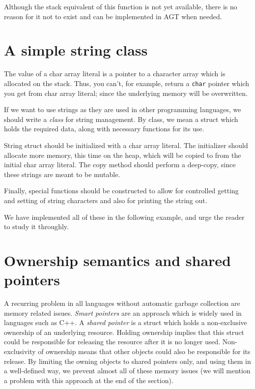 \documentclass[times, utf8, diplomski]{fer}
\theoremstyle{definition}
\newcommand{\textcode}[3]{
    
}
\begin{document}
Although the stack equivalent of this function is not yet available, there
is no reason for it not to exist and can be implemented in AGT when needed.

\section{A simple string class}

The value of a char array literal is a pointer to a character array
which is allocated on the stack. Thus, you can't, for example, return
a \texttt{char} pointer which you get from char array literal;
since the underlying memory will be overwritten.

If we want to use strings as they are used in other programming languages,
we should write a \textit{class} for string management.
By class, we mean a struct which holds the required data, along with necessary functions for its use.

String struct should be initialized with a char array literal.
The initializer should allocate more memory, this time on the heap,
which will be copied to from the initial char array literal.
The copy method should perform a deep-copy, since these strings are meant to be mutable.

Finally, special functions should be constructed to allow for controlled getting and setting of
string characters and also for printing the string out.

We have implemented all of these in the following example, and urge the reader
to study it throughly.

\textcode{\resdir/programs/string_mgmt.agt}{string_cl}{String class}
\textcode{\resdir/programs/string_mgmt.out}{string_cl_out}{String class - output}

\section{Ownership semantics and shared pointers}

A recurring problem in all languages without automatic garbage collection are
memory related issues.  \textit{Smart pointers} are an approach which is widely
used in languages such as C++.  A \textit{shared pointer} \citep{c_shared_ptr}
is a struct which holds a non-exclusive ownership of an underlying resource.
Holding ownership implies that this struct could be responsible for releasing
the resource after it is no longer used. Non-exclusivity of ownership means
that other objects could also be responsible for its release. By limiting the
owning objects to shared pointers only, and using them in a well-defined way,
we prevent almost all of these memory issues (we will mention a problem with
this approach at the end of the section).
\end{document}
